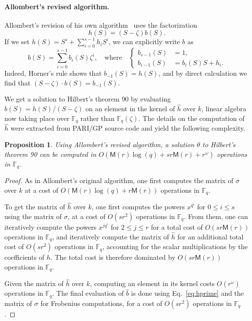 \documentclass{mcom-l}
\theoremstyle{plain}
\newtheorem{proposition}[theorem]{Proposition}
\theoremstyle{definition}
\newcommand{\F}{\ensuremath{\mathbb{F}}}
\newcommand{\MM}{\ensuremath{\mathsf{M}}}
\newcounter{algorithm}
\begin{document}
\paragraph{\bf Allombert's revised algorithm.}
Allombert's revision of his own algorithm~\cite{Allombert02-rev} uses
the factorization
\begin{equation}
  \label{eq:allomb-b}
  h(S)=(S-\zeta) b(S).
\end{equation}
If we set $h(S)=S^s+\sum_{i=0}^{s-1}h_iS^i$, we can
explicitly write $b$ as
\begin{equation}
  \label{eq:hprime}
  b(S)=\sum_{i=0}^{s-1}b_i(S)\zeta^i,\quad
  \text{where}\quad
  \left\{\begin{aligned}
    b_{s-1}(S) &= 1,\\
    b_{i-1}(S) &= b_i(S) S + h_i.
  \end{aligned}\right.
\end{equation}
Indeed, Horner's rule shows that $b_{-1}(S)=h(S)$, and by direct
calculation we find that $(S-\zeta)\cdot b(S) = b_{-1}(S)$.

We get a solution to Hilbert's theorem 90 by evaluating
$b(S)=h(S)/(S-\zeta)$ on an element in the kernel of $\hat{h}$ over
$k$, linear algebra now taking place over $\F_q$ rather than
$\F_q(\zeta)$. The details on the computation of $\hat{h}$ were
extracted from PARI/GP source code and yield the following complexity.

\begin{proposition}
  Using Allombert's revised algorithm, a solution $\theta$ to
  Hilbert's theorem 90 can be computed in $O(\MM(r) \log(q) + s r
  \MM(r) + r^\omega)$ operations in $\F_q$.
\end{proposition}

\begin{proof}
As in Allombert's original algorithm, one first
computes the matrix of $\sigma$ over $k$ at a cost of
$O(\MM(r) \log(q) + r \MM(r))$ operations in $\F_q$.


To get the matrix of $\hat{h}$ over $k$, one first computes the powers
$x^{q^i}$ for $0 \leq i \leq s$ using the matrix of $\sigma$, at a
cost of $O(s r^2)$ operations in $\F_q$.  From them, one can
iteratively compute the powers $x^{j q^i}$ for $2 \leq j \leq r$ for a
total cost of $O(s r \MM(r))$ operations in $\F_q$, and iteratively
compute the matrix of $\hat{h}$ for an additional total cost of $O(s
r^2)$ operations in $\F_q$, accounting for the scalar multiplications
by the coefficients of $h$.  The total cost is therefore dominated by
$O(s r \MM(r))$ operations in $\F_q$.

Given the matrix of $\hat{h}$ over $k$, computing an element in its
kernel costs $O(r^\omega)$ operations in $\F_q$.  The final evaluation
of $\hat{b}$ is done using Eq.~\eqref{eq:hprime} and the matrix of
$\sigma$ for Frobenius computations, for a cost of $O(s r^2)$ operations
in $\F_q$.
\end{proof}
\end{document}
